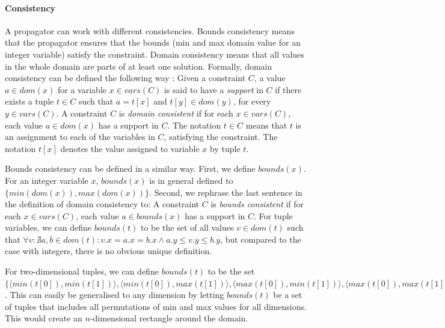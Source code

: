 \documentclass[a4paper,11pt]{article}
\begin{document}
\paragraph{Consistency}
A propagator can work with different consistencies. Bounds consistency means that the propagator ensures that the bounds (min and max domain value for an integer variable) satisfy the constraint. Domain consistency means that all values in the whole domain are parts of at least one solution. Formally, domain consistency can be defined the following way \cite{FruehwirthMS06}: Given a constraint $C$, a value $a\in \mathit{dom}(x)$ for a variable $x\in \mathit{vars}(C)$ is said to have a \textit{support} in $C$ if there exists a tuple $t\in C$ such that $a=t[x]$ and $t[y]\in \mathit{dom}(y)$, for every $y\in \mathit{vars}(C)$. A constraint $C$ is \textit{domain consistent} if for each $x\in \mathit{vars}(C)$, each value $a\in \mathit{dom}(x)$ has a support in $C$. The notation $t\in C$ means that $t$ is an assignment to each of the variables in $C$, satisfying the constraint. The notation $t[x]$ denotes the value assigned to variable $x$ by tuple $t$. 

Bounds consistency can be defined in a similar way. First, we define $\mathit{bounds}(x)$. For an integer variable $x$, $\mathit{bounds}(x)$ is in general defined to $\{\mathit{min}(\mathit{dom}(x)),\mathit{max}(\mathit{dom}(x))\}$. Second, we rephrase the last sentence in the definition of domain consistency to: A constraint $C$ is \textit{bounds consistent} if for each $x\in \mathit{vars}(C)$, each value $a\in \mathit{bounds}(x)$ has a support in $C$.  For tuple variables, we can define $\mathit{bounds}(t)$ to be the set of all values $v\in \mathit{dom}(t)$ such that $\forall v:\nexists a,b\in \mathit{dom}(t):v.x=a.x=b.x \land a.y \le v.y \le b.y$, but compared to the case with integers, there is no obvious unique definition.

For two-dimensional tuples, we can define $\mathit{bounds}(t)$ to be the set $\lbrace \allowbreak
\langle \mathit{min}(t[0]), \mathit{min}(t[1]) \rangle, \allowbreak
\langle \mathit{min}(t[0]), \mathit{max}(t[1]) \rangle, \allowbreak
\langle \mathit{max}(t[0]), \mathit{min}(t[1]) \rangle, \allowbreak
\langle \mathit{max}(t[0]), \mathit{max}(t[1]) \rangle, \allowbreak
\rbrace$. This can easily be generalised to any dimension by letting $\mathit{bounds}(t)$ be a set of tuples that includes all permutations of min and max values for all dimensions. This would create an $n$-dimensional rectangle around the domain.
\end{document}
